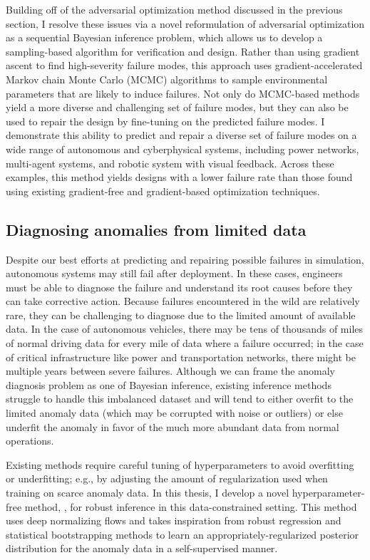 Building off of the adversarial optimization method discussed in the previous section, I resolve these issues via a novel reformulation of adversarial optimization as a sequential Bayesian inference problem, which allows us to develop a sampling-based algorithm for verification and design. Rather than using gradient ascent to find high-severity failure modes, this approach uses gradient-accelerated Markov chain Monte Carlo (MCMC) algorithms to sample environmental parameters that are likely to induce failures. Not only do MCMC-based methods yield a more diverse and challenging set of failure modes, but they can also be used to repair the design by fine-tuning on the predicted failure modes. I demonstrate this ability to predict and repair a diverse set of failure modes on a wide range of autonomous and cyberphysical systems, including power networks, multi-agent systems, and robotic system with visual feedback. Across these examples, this method yields designs with a lower failure rate than those found using existing gradient-free and gradient-based optimization techniques.

\subsection{Diagnosing anomalies from limited data}

Despite our best efforts at predicting and repairing possible failures in simulation, autonomous systems may still fail after deployment. In these cases, engineers must be able to diagnose the failure and understand its root causes before they can take corrective action. Because failures encountered in the wild are relatively rare, they can be challenging to diagnose due to the limited amount of available data. In the case of autonomous vehicles, there may be tens of thousands of miles of normal driving data for every mile of data where a failure occurred; in the case of critical infrastructure like power and transportation networks, there might be multiple years between severe failures. Although we can frame the anomaly diagnosis problem as one of Bayesian inference, existing inference methods struggle to handle this imbalanced dataset and will tend to either overfit to the limited anomaly data (which may be corrupted with noise or outliers) or else underfit the anomaly in favor of the much more abundant data from normal operations.

Existing methods require careful tuning of hyperparameters to avoid overfitting or underfitting; e.g., by adjusting the amount of regularization used when training on scarce anomaly data. In this thesis, I develop a novel hyperparameter-free method, \ouralg{}, for robust inference in this data-constrained setting. This method uses deep normalizing flows and takes inspiration from robust regression and statistical bootstrapping methods to learn an appropriately-regularized posterior distribution for the anomaly data in a self-supervised manner.

